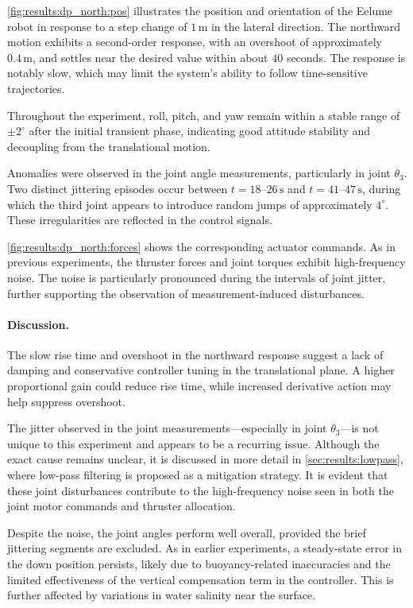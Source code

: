 \autoref{fig:results:dp_north:pos} illustrates the position and orientation of the Eelume robot in response to a step change of \(1\,\mathrm{m}\) in the lateral direction. The northward motion exhibits a second-order response, with an overshoot of approximately \(0.4\,\mathrm{m}\), and settles near the desired value within about \(40\) seconds. The response is notably slow, which may limit the system's ability to follow time-sensitive trajectories.

Throughout the experiment, roll, pitch, and yaw remain within a stable range of \(\pm 2^\circ\) after the initial transient phase, indicating good attitude stability and decoupling from the translational motion.

Anomalies were observed in the joint angle measurements, particularly in joint \(\theta_3\). Two distinct jittering episodes occur between \(t = 18\text{–}26\,\mathrm{s}\) and \(t = 41\text{–}47\,\mathrm{s}\), during which the third joint appears to introduce random jumps of approximately \(4^\circ\). These irregularities are reflected in the control signals.

\autoref{fig:results:dp_north:forces} shows the corresponding actuator commands. As in previous experiments, the thruster forces and joint torques exhibit high-frequency noise. The noise is particularly pronounced during the intervals of joint jitter, further supporting the observation of measurement-induced disturbances.

\paragraph{Discussion.}

The slow rise time and overshoot in the northward response suggest a lack of damping and conservative controller tuning in the translational plane. A higher proportional gain could reduce rise time, while increased derivative action may help suppress overshoot.

The jitter observed in the joint measurements—especially in joint \(\theta_3\)—is not unique to this experiment and appears to be a recurring issue. Although the exact cause remains unclear, it is discussed in more detail in \autoref{sec:results:lowpass}, where low-pass filtering is proposed as a mitigation strategy. It is evident that these joint disturbances contribute to the high-frequency noise seen in both the joint motor commands and thruster allocation.

Despite the noise, the joint angles perform well overall, provided the brief jittering segments are excluded. As in earlier experiments, a steady-state error in the down position persists, likely due to buoyancy-related inaccuracies and the limited effectiveness of the vertical compensation term in the controller. This is further affected by variations in water salinity near the surface.

